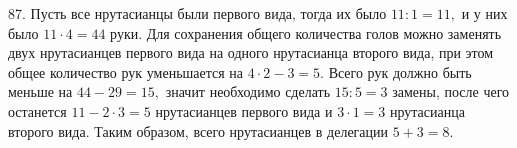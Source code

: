 87. Пусть все нрутасианцы были первого вида, тогда их было $11:1=11,$ и у них было $11\cdot4=44$ руки. Для сохранения общего количества голов можно заменять двух нрутасианцев первого вида на одного нрутасианца второго вида, при этом общее количество рук уменьшается на $4\cdot2-3=5.$ Всего рук должно быть меньше на  $44-29=15,$ значит необходимо сделать $15:5=3$ замены, после чего останется $11-2\cdot3=5$ нрутасианцев первого вида и $3\cdot1=3$ нрутасианца второго вида. Таким образом, всего нрутасианцев в делегации $5+3=8.$\\
